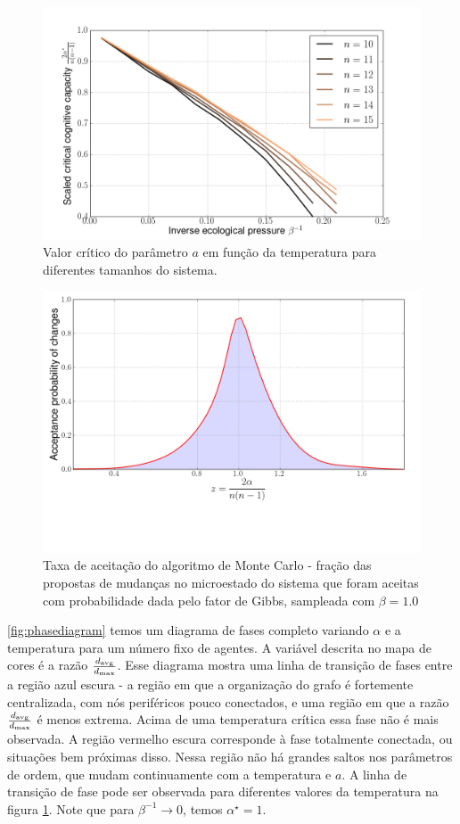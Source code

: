 \begin{figure}
  \includegraphics[width = \textwidth]{figuras/critical.png}
  \caption{Valor crítico do parâmetro $a$ em função da temperatura para diferentes tamanhos do sistema.}
  \label{fig:critical}
\end{figure}
\begin{figure}
  \includegraphics[width = \textwidth]{figuras/acceptrate.png}
  \caption{Taxa de aceitação do algoritmo de Monte Carlo - fração das propostas de mudanças no microestado do sistema que foram aceitas com probabilidade dada pelo fator de Gibbs, sampleada com $\beta = 1.0$}
  \label{fig:acceptrate}
\end{figure}

\ref{fig:phasediagram} temos um diagrama de fases completo variando $\alpha$ e a temperatura para um número fixo de agentes. A variável descrita no mapa de cores é a razão $\frac{d_{\text{avg}}}{d_{\text{max}}}$. Esse diagrama mostra uma linha de transição de fases entre a região azul escura - a região em que a organização do grafo é fortemente centralizada, com nós periféricos pouco conectados, e uma região em que a razão $\frac{d_{\text{avg}}}{d_{\text{max}}}$ é menos extrema. Acima de uma temperatura crítica essa fase não é mais observada. A região vermelho escura corresponde à fase totalmente conectada, ou situações bem próximas disso. Nessa região não há grandes saltos nos parâmetros de ordem, que mudam continuamente com a temperatura e $a$. A linha de transição de fase pode ser observada para diferentes valores da temperatura na figura \ref{fig:critical}. Note que para $\beta^{-1} \to 0$, temos $\alpha^{\star} = 1$.

